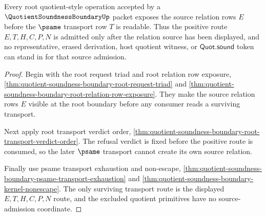 \begin{theorem}
\label{thm:quotient-soundness-boundary-root-psame-source-admission}
Every root quotient-style operation accepted by a $\QuotientSoundnessBoundaryUp$ packet exposes the source relation rows $E$ before the $\psame$ transport row $T$ is readable. Thus the positive route $E,T,H,C,P,N$ is admitted only after the relation source has been displayed, and no representative, erased derivation, host quotient witness, or $\mathsf{Quot.sound}$ token can stand in for that source admission.
\end{theorem}
\begin{proof}
Begin with the root request triad and root relation row exposure, \autoref{thm:quotient-soundness-boundary-root-request-triad} and \autoref{thm:quotient-soundness-boundary-root-relation-row-exposure}. They make the source relation rows $E$ visible at the root boundary before any consumer reads a surviving transport.

Next apply root transport verdict order, \autoref{thm:quotient-soundness-boundary-root-transport-verdict-order}. The refusal verdict is fixed before the positive route is consumed, so the later $\psame$ transport cannot create its own source relation.

Finally use psame transport exhaustion and non-escape, \autoref{thm:quotient-soundness-boundary-psame-transport-exhaustion} and \autoref{thm:quotient-soundness-boundary-kernel-nonescape}. The only surviving transport route is the displayed $E,T,H,C,P,N$ route, and the excluded quotient primitives have no source-admission coordinate.
\end{proof}

